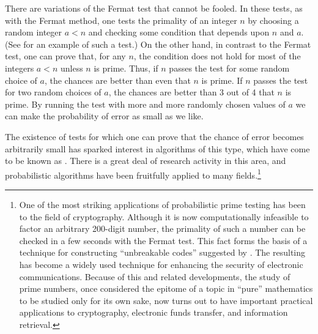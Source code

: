 There are variations of the Fermat test that cannot be fooled.  In these tests,
as with the Fermat method, one tests the primality of an integer \( n \) by
choosing a random integer \( a < n \) and checking some condition that depends
upon \( n \) and \( a \).  (See  for an example of such a test.)
On the other hand, in contrast to the Fermat test, one can prove that, for any
\( n \), the condition does not hold for most of the integers \( a < n \) unless
\( n \) is prime.  Thus, if \( n \) passes the test for some random choice of
\( a \), the chances are better than even that \( n \) is prime.  If \( n \) passes
the test for two random choices of \( a \), the chances are better than 3 out of
4 that \( n \) is prime. By running the test with more and more randomly chosen
values of \( a \) we can make the probability of error as small as we like.

The existence of tests for which one can prove that the chance of error becomes
arbitrarily small has sparked interest in algorithms of this type, which have
come to be known as .  There is a great deal
of research activity in this area, and probabilistic algorithms have been
fruitfully applied to many fields.\footnote{One of the most striking
applications of probabilistic prime testing has been to the field of
cryptography.  Although it is now computationally infeasible to factor an
arbitrary 200-digit number, the primality of such a number can be checked in a
few seconds with the Fermat test.  This fact forms the basis of a technique for
constructing ``unbreakable codes'' suggested by .
The resulting  has become a widely used
technique for enhancing the security of electronic communications.  Because of
this and related developments, the study of prime numbers, once considered the
epitome of a topic in ``pure'' mathematics to be studied only for its own sake,
now turns out to have important practical applications to cryptography,
electronic funds transfer, and information retrieval.}

